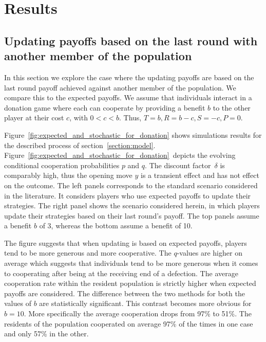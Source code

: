\documentclass[11pt]{article}
\theoremstyle{plainCl1}
\theoremstyle{plainCl2}
\begin{document}
\section{Results}\label{section:results}
\subsection{Updating payoffs based on the last round with another member of the population}\label{section:donation}

In this section we explore the case where the updating payoffs are based on the
last round payoff achieved against another member of the population. We compare
this to the expected payoffs. We assume that individuals interact in a donation
game  where each can cooperate by providing a benefit \(b\) to the other
player at their cost \(c\), with \(0 < c < b\). Thus, \(T=b, R=b-c, S=-c, P=0\).

Figure~\ref{fig:expected_and_stochastic_for_donation} shows simulations results
for the described process of section~\ref{section:model}.
Figure~\ref{fig:expected_and_stochastic_for_donation}~depicts the evolving
conditional cooperation probabilities $p$ and $q$. The discount factor~$\delta$
is comparably high, thus the opening move \(y\) is a transient effect and has
not effect on the outcome. The left panels corresponds to the standard scenario
considered in the literature. It considers players who use expected payoffs to
update their strategies. The right panel shows the scenario considered herein,
in which players update their strategies based on their last round's payoff. The
top panels assume a benefit \(b\) of 3, whereas the bottom assume a benefit of
10.

The figure suggests that when updating is based on expected payoffs, players
tend to be more generous and more cooperative. The $q$-values are higher on
average which suggests that individuals tend to be more generous when it comes
to cooperating after being at the receiving end of a defection. %
The average cooperation rate within the resident population is strictly higher
when expected payoffs are considered. The difference between the two methods for
both the values of \(b\) are statistically significant. This contrast becomes
more obvious for \(b=10\). More specifically the average cooperation drops from
97\% to 51\%. The residents of the population cooperated on average 97\% of the
times in one case and only 57\% in the other.
\end{document}
